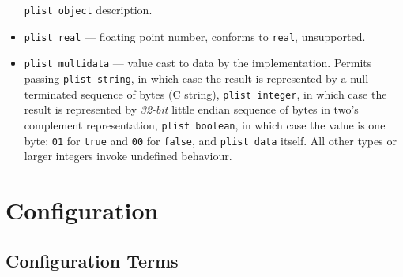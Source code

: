 \documentclass[]{article}
\begin{document}
\begin{itemize}
  \texttt{plist\ object} description.
\item
  \texttt{plist\ real} --- floating point number, conforms to
  \texttt{real}, unsupported.
\item
  \texttt{plist\ multidata} --- value cast to data by the implementation.
  Permits passing \texttt{plist\ string}, in which case the result is
  represented by a null-terminated sequence of bytes (C string),
  \texttt{plist\ integer}, in which case the result is represented by
  \emph{32-bit} little endian sequence of bytes in two's complement
  representation, \texttt{plist\ boolean}, in which case the value is
  one byte: \texttt{01} for \texttt{true} and \texttt{00} for
  \texttt{false}, and \texttt{plist\ data} itself. All other types or
  larger integers invoke undefined behaviour.
\end{itemize}

\section{Configuration}\label{configuration-overview}

\subsection{Configuration Terms}\label{configuration-terms}
\end{document}
